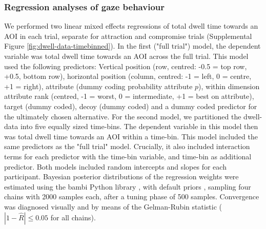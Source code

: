 \documentclass[11pt, a4paper]{article}
\begin{document}
\subsubsection*{Regression analyses of gaze behaviour}
We performed two linear mixed effects regressions of total dwell time towards an AOI in each trial, separate for attraction and compromise trials (Supplemental Figure \ref{fig:dwell-data-timebinned}). In the first ("full trial") model, the dependent variable was total dwell time towards an AOI across the full trial. This model used the following predictors: Vertical position (row, centred: -0.5 = top row, +0.5, bottom row), horizontal position (column, centred: -1 = left, 0 = centre, +1 = right), attribute (dummy coding probability attribute $p$), within dimension attribute rank (centred, -1 = worst, 0 = intermediate, +1 = best on attribute), target (dummy coded), decoy (dummy coded) and a dummy coded predictor for the ultimately chosen alternative. For the second model, we partitioned the dwell-data into five equally sized time-bins. The dependent variable in this model then was total dwell time towards an AOI within a time-bin. This model included the same predictors as the "full trial" model. Crucially, it also included interaction terms for each predictor with the time-bin variable, and time-bin as additional predictor. Both models included random intercepts and slopes for each participant. Bayesian posterior distributions of the regression weights were estimated using the bambi Python library \parencite{yarkoni2016BambiSimpleInterface}, with default priors \parencite{westfall2017StatisticalDetailsDefault}, sampling four chains with 2000 samples each, after a tuning phase of 500 samples. Convergence was diagnosed visually and by means of the Gelman-Rubin statistic ($|1 - \hat{R}| \le 0.05$ for all chains).
\end{document}
